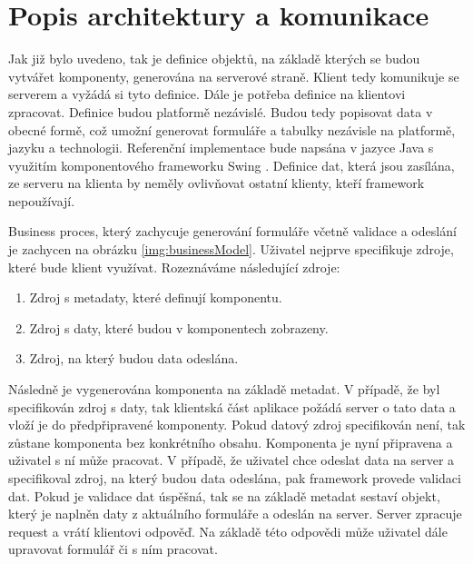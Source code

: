 \section{Popis architektury a komunikace}
Jak již bylo uvedeno, tak je definice objektů, na základě kterých se budou vytvářet komponenty, generována na serverové straně. Klient tedy komunikuje se serverem a vyžádá si tyto definice. Dále je potřeba definice na klientovi zpracovat. Definice budou platformě nezávislé. Budou tedy popisovat data v obecné formě, což umožní generovat formuláře a tabulky nezávisle na platformě, jazyku a technologii. Referenční implementace bude napsána v jazyce Java s využitím komponentového frameworku Swing \cite{swing}. Definice dat, která jsou zasílána, ze serveru na klienta by neměly ovlivňovat ostatní klienty, kteří framework nepoužívají. 

Business proces, který zachycuje generování formuláře včetně validace a odeslání je zachycen na obrázku \ref{img:businessModel}. Uživatel nejprve specifikuje zdroje, které bude klient využívat. Rozeznáváme následující zdroje:
\begin{enumerate}
\item Zdroj s metadaty, které definují komponentu.
\item Zdroj s daty, které budou v komponentech zobrazeny.
\item Zdroj, na který budou data odeslána.
\end{enumerate}
Následně je vygenerována komponenta na základě metadat. V případě, že byl specifikován zdroj s daty, tak klientská část aplikace požádá server o tato data a vloží je do předpřipravené komponenty. Pokud datový zdroj specifikován není, tak zůstane komponenta bez konkrétního obsahu. Komponenta je nyní připravena a uživatel s ní může pracovat. V případě, že uživatel chce odeslat data na server a specifikoval zdroj, na který budou data odeslána, pak framework provede validaci dat. Pokud je validace dat úspěšná, tak se na základě metadat sestaví objekt, který je naplněn daty z aktuálního formuláře a odeslán na server. Server zpracuje request a vrátí klientovi odpověď. Na základě této odpovědi může uživatel dále upravovat formulář či s ním pracovat.

